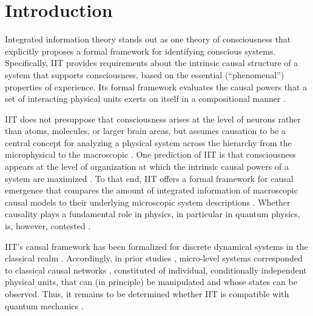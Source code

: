 \documentclass[preprints, article, accept, pdftex, moreauthors, letterpaper]{Definitions/mdpi}
\renewcommand{\=}[1]{\stackrel{#1}{=}} %
\renewcommand{\*}{\otimes}%
\begin{document}
\section{Introduction}

Integrated information theory \cite{Oizumi2014, Tononi2016, Albantakis2020, Albantakis2022_4_0} stands out as one theory of consciousness that explicitly proposes a formal framework for identifying conscious systems. 
Specifically, IIT provides requirements about the intrinsic causal structure of a system that supports consciousness, based on the essential (``phenomenal'') properties of experience.
Its formal framework evaluates the causal powers that a set of interacting physical units exerts on itself in a compositional manner \cite{Oizumi2014, Albantakis2019cc, Barbosa2021, Grasso2021, Albantakis2022_4_0}. 

IIT does not presuppose that consciousness arises at the level of neurons rather than atoms, molecules, or larger brain areas, but assumes causation to be a central concept for analyzing a physical system across the hierarchy from the microphysical to the macroscopic \cite{Hoel2013, Hoel2016, Tononi2016, Marshall2018, Albantakis2021}.
One prediction of IIT is that consciousness appears at the level of organization at which the intrinsic causal powers of a system are maximized \cite{Tononi2016}.
To that end, IIT offers a formal framework for causal emergence that compares the amount of integrated information of macroscopic causal models to their underlying microscopic system descriptions \cite{Hoel2016, Marshall2018}.  
Whether causality plays a fundamental role in physics, in particular in quantum physics, is, however, contested \cite{Brukner2014,DAriano2018}. 

IIT's causal framework has been formalized for discrete dynamical systems in the classical realm \cite{Oizumi2014, Albantakis2015, Mayner2018, Gomez2021, Albantakis2022_4_0}. 
Accordingly, in prior studies \cite{Hoel2013, Hoel2016, Marshall2018}, micro-level systems corresponded to classical causal networks \cite{Pearl2000, Albantakis2019}, constituted of individual, conditionally independent physical units, that can (in principle) be manipulated and whose states can be observed. 
Thus, it remains to be determined whether IIT is compatible with quantum mechanics \cite{Barrett2019, Carroll2021}.
\end{document}
